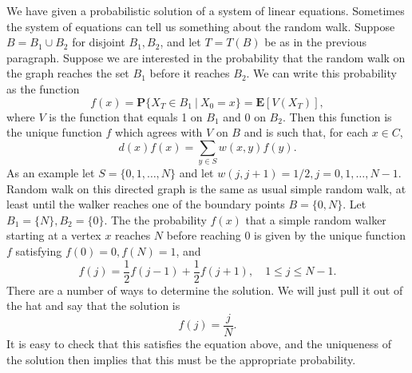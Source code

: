 \documentclass{stml-l}
\theoremstyle{definition}
\numberwithin{equation}{chapter}
\numberwithin{figure}{chapter}
\numberwithin{figure}{section}
\begin{document}
We have given a probabilistic solution of a system of linear
equations. Sometimes the system of equations can tell us something
about the random walk. Suppose $B=B_{1}\cup B_{2}$ for disjoint
$B_{1},B_{2}$, and let $T=T(B)$ be as in the previous paragraph.
Suppose we are interested in the probability that the random walk on
the graph reaches the set $B_{1}$ before it reaches $B_{2}$. We can
write this probability as the function
\begin{equation*}
f(x)=\mathbf{P}\{X_{T}\in B_{1}\ |\ X_{0}=x\}=\mathbf{E}[V(X_{T})],
\end{equation*}
where $V$ is the function that equals 1 on $B_{1}$ and $0$ on
$B_{2}$. Then this function is the unique function $f$ which agrees
with $V$ on $B$ and is such that, for each $x\in C$,
\begin{equation*}
d(x)f(x)=\sum\limits_{y\in S}w(x,y)f(y).
\end{equation*}
As an example let $S=\{0,1,\ldots,N\}$ and let $w(j,j+1)=1/2,j=
0,1,\ldots,N-1$. Random walk on this directed graph is the same as
usual simple random walk, at least until the walker reaches one of
the boundary points $B=\{0,N\}$. Let $B_{1}=\{N\},B_{2}=\{0\}$. The
the probability $f(x)$ that a simple random walker starting at a
vertex $x$ reaches $N$ before reaching $0$ is given by the unique
function $f$ satisfying $f(0)=0,f(N)=1$, and
\begin{equation*}
f(j)=\frac{1}{2}f(j-1)+\frac{1}{2}f(j+1),\quad 1\leq j\leq N-1.
\end{equation*}
There are a number of ways to determine the solution. We will just
pull it out of the hat and say that the solution is
\begin{equation*}
f(j)=\frac{j}{N}.
\end{equation*}
It is easy to check that this satisfies the equation above, and the
uniqueness of the solution then implies that this must be the
appropriate probability.
\end{document}
